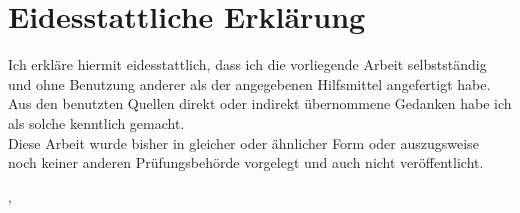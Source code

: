 
\thispagestyle{empty}

\section*{Eidesstattliche Erklärung}
\vspace*{2em}

Ich erkläre hiermit eidesstattlich, dass ich die vorliegende Arbeit selbstständig und ohne Benutzung anderer als der angegebenen Hilfsmittel angefertigt habe. Aus den benutzten Quellen direkt oder indirekt übernommene Gedanken habe ich als solche kenntlich gemacht.\\
\newline
Diese Arbeit wurde bisher in gleicher oder ähnlicher Form oder auszugsweise noch keiner anderen Prüfungsbehörde vorgelegt und auch nicht veröffentlicht.

\vspace{3em}

\abgabeort, \datumAbgabe
\vspace{4em}

\autor
